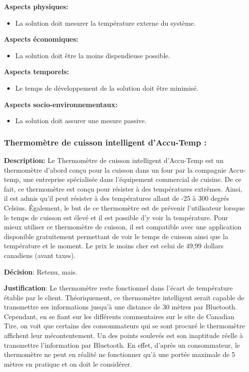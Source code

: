 \textbf{Aspects physiques:}
\begin{itemize}[label = {--}]
    \item La solution doit mesurer la température externe du système.
\end{itemize}

\textbf{Aspects économiques:}
\begin{itemize}[label = {--}]
    \item La solution doit être la moins dispendieuse possible.
\end{itemize}

\textbf{Aspects temporels:}
\begin{itemize}[label = {--}]
    \item Le temps de développement de la solution doit être minimisé.
\end{itemize}

\textbf{Aspects socio-environnementaux:}
\begin{itemize}[label = {--}]
    \item La solution doit assurer une mesure passive.
\end{itemize}

\subsubsection{Thermomètre de cuisson intelligent d’Accu-Temp :}
\label{subsubsection:accu-temp}

\textbf{Description:} Le Thermomètre de cuisson intelligent d’Accu-Temp est un thermomètre d’abord conçu pour la cuisson dans un four par la compagnie Accu-temp, une entreprise spécialisée dans l’équipement commercial de cuisine. De ce fait, ce thermomètre est conçu pour résister à des températures extrêmes. Ainsi, il est admis qu’il peut résister à des températures allant de -25 à 300 degrés Celsius. Également, le but de ce thermomètre est de prévenir l’utilisateur lorsque le temps de cuisson est élevé et il est possible d’y voir la température. Pour mieux utiliser ce thermomètre de cuisson, il est compatible avec une application disponible gratuitement permettant de voir le temps de cuisson ainsi que la température et le moment. Le prix le moins cher est celui de 49,99 dollars canadiens (avant taxes).

\textbf{Décision}: Retenu, mais.

\textbf{Justification}: Le thermomètre reste fonctionnel dans l’écart de température établie par le client. Théoriquement, ce thermomètre intelligent serait capable de transmettre ses informations jusqu’à une distance de 30 mètres par Bluetooth. Cependant, en se fiant sur les différents commentaires sur le site de Canadian Tire, on voit que certains des consommateurs qui se sont procuré le thermomètre affichent leur mécontentement. Un des points soulevés est son inaptitude réelle à transmettre l’information par Bluetooth. En effet, d'après un consommateur, le thermomètre ne peut en réalité ne fonctionner qu’à une portée maximale de 5 mètres en pratique et on doit le considérer.

